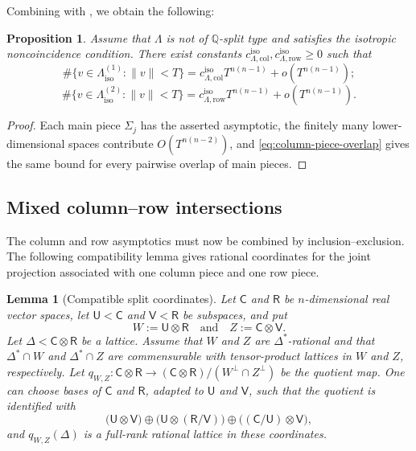\documentclass[reqno,11pt]{amsart}
\numberwithin{equation}{section}
\newtheorem{lemma}[theorem]{Lemma}
\newtheorem{proposition}[theorem]{Proposition}
\theoremstyle{definition}
\theoremstyle{remark}
\begin{document}
Combining  with
, we obtain the following:
\begin{proposition}\label{prop:column-row-isotropic-asymptotic}
Assume that $\Lambda$ is not of $\mathbb Q$-split type and satisfies the isotropic
noncoincidence condition.
There exist constants
$c_{\Lambda,\mathrm{col}}^{\mathrm{iso}},
 c_{\Lambda,\mathrm{row}}^{\mathrm{iso}}\ge0$ such that
$$
\#\{v\in\Lambda_{\operatorname{iso}}^{(1)}:\|v\|< T\}
=
c_{\Lambda,\mathrm{col}}^{\mathrm{iso}}T^{n(n-1)} + o (T^{n(n-1)}) ;$$ 
$$\#\{v\in\Lambda_{\operatorname{iso}}^{(2)}:\|v\|< T\}
=
c_{\Lambda,\mathrm{row}}^{\mathrm{iso}}T^{n(n-1)}+ o (T^{n(n-1)}).$$
\end{proposition}
\begin{proof}
Each main piece $\Sigma_j$ has the asserted asymptotic, the finitely
many lower-dimensional spaces contribute $O(T^{n(n-2)})$, and
\eqref{eq:column-piece-overlap} gives the same bound for every pairwise
overlap of main pieces.\end{proof}

\subsection{Mixed column--row intersections}

The column and row asymptotics must now be combined by inclusion--exclusion.
The following compatibility lemma gives rational coordinates for the joint
projection associated with one column piece and one row piece. 

\begin{lemma}[Compatible split coordinates]
\label{lem:compatible-split-coordinates}
Let $\mathsf C$ and $\mathsf R$ be $n$-dimensional real vector spaces,
let $\mathsf U<\mathsf C$ and $\mathsf V<\mathsf R$ be subspaces, and put
$$
W:=\mathsf U\otimes\mathsf R\quad\text{and}\quad
Z:=\mathsf C\otimes\mathsf V.
$$
Let $\Delta<\mathsf C\otimes\mathsf R$ be a lattice. Assume that $W$ and
$Z$ are $\Delta^*$-rational and that
$\Delta^*\cap W$ and
$\Delta^*\cap Z $
are commensurable with tensor-product lattices in $W$ and $Z$, respectively.
Let $q_{W,Z}:
\mathsf C\otimes\mathsf R
\to
(\mathsf C\otimes\mathsf R)/(W^\perp\cap Z^\perp)
$
be the quotient map. One can choose bases of $\mathsf C$ and
$\mathsf R$, adapted to $\mathsf U$ and $\mathsf V$, such that
the quotient is identified with
$$
\bigl(\mathsf U\otimes\mathsf V\bigr)
\oplus
\bigl(\mathsf U\otimes(\mathsf R/\mathsf V)\bigr)
\oplus
\bigl((\mathsf C/\mathsf U)\otimes\mathsf V\bigr),
$$
and $q_{W,Z}(\Delta)$ is a full-rank rational lattice in these
coordinates.
\end{lemma}
\end{document}
